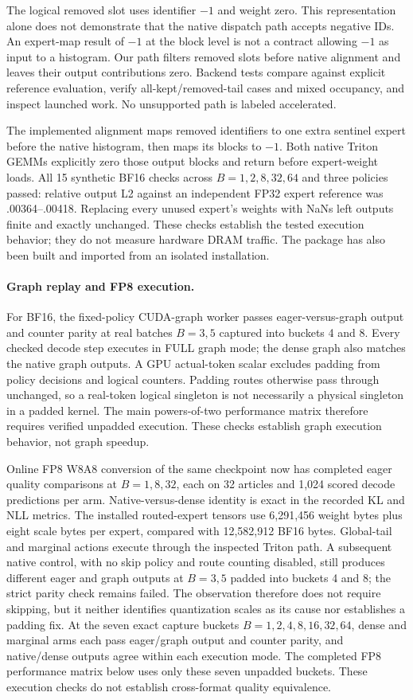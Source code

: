 \documentclass[10pt,twocolumn]{article}
\begin{document}
The logical removed slot uses identifier $-1$ and weight zero. This representation alone does not demonstrate that the native dispatch path accepts negative IDs. An expert-map result of $-1$ at the block level is not a contract allowing $-1$ as input to a histogram. Our path filters removed slots before native alignment and leaves their output contributions zero. Backend tests compare against explicit reference evaluation, verify all-kept/removed-tail cases and mixed occupancy, and inspect launched work. No unsupported path is labeled accelerated.

The implemented alignment maps removed identifiers to one extra sentinel expert before the native histogram, then maps its blocks to $-1$. Both native Triton GEMMs explicitly zero those output blocks and return before expert-weight loads. All 15 synthetic BF16 checks across $B=1,2,8,32,64$ and three policies passed: relative output L2 against an independent FP32 expert reference was .00364--.00418. Replacing every unused expert's weights with NaNs left outputs finite and exactly unchanged. These checks establish the tested execution behavior; they do not measure hardware DRAM traffic. The package has also been built and imported from an isolated installation.

\paragraph{Graph replay and FP8 execution.}
For BF16, the fixed-policy CUDA-graph worker passes eager-versus-graph output and counter parity at real batches $B=3,5$ captured into buckets 4 and 8. Every checked decode step executes in FULL graph mode; the dense graph also matches the native graph outputs. A GPU actual-token scalar excludes padding from policy decisions and logical counters. Padding routes otherwise pass through unchanged, so a real-token logical singleton is not necessarily a physical singleton in a padded kernel. The main powers-of-two performance matrix therefore requires verified unpadded execution. These checks establish graph execution behavior, not graph speedup.

Online FP8 W8A8 conversion of the same checkpoint now has completed eager quality comparisons at $B=1,8,32$, each on 32 articles and 1,024 scored decode predictions per arm. Native-versus-dense identity is exact in the recorded KL and NLL metrics. The installed routed-expert tensors use 6,291,456 weight bytes plus eight scale bytes per expert, compared with 12,582,912 BF16 bytes. Global-tail and marginal actions execute through the inspected Triton path. A subsequent native control, with no skip policy and route counting disabled, still produces different eager and graph outputs at $B=3,5$ padded into buckets 4 and 8; the strict parity check remains failed. The observation therefore does not require skipping, but it neither identifies quantization scales as its cause nor establishes a padding fix. At the seven exact capture buckets $B=1,2,4,8,16,32,64$, dense and marginal arms each pass eager/graph output and counter parity, and native/dense outputs agree within each execution mode. The completed FP8 performance matrix below uses only these seven unpadded buckets. These execution checks do not establish cross-format quality equivalence.
\end{document}
